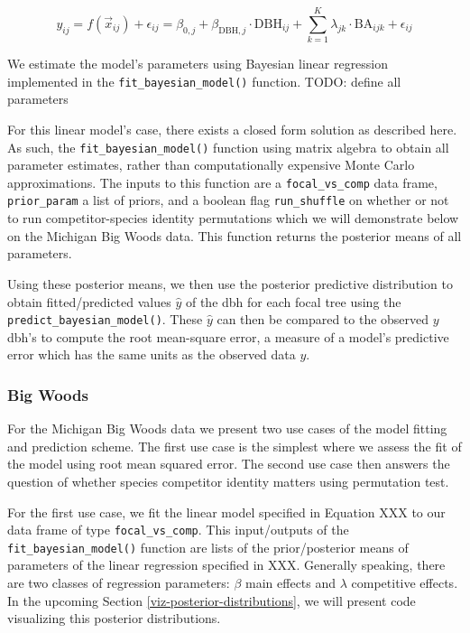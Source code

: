 \documentclass[12pt]{article}
\begin{document}
\[
\newcommand{\dbh}{\text{DBH}}
\newcommand{\biomass}{\text{biomass}}
\newcommand{\BA}{\text{BA}}
y_{ij} = f(\vec{x}_{ij}) + \epsilon_{ij} = \beta_{0,j} + \beta_{\dbh,j} \cdot \dbh_{ij} + \sum_{k=1}^{K} \lambda_{jk} \cdot \BA_{ijk} + \epsilon_{ij}
\]

We estimate the model's parameters using Bayesian linear regression
implemented in the \texttt{fit\_bayesian\_model()} function. TODO:
define all parameters

For this linear model's case, there exists a closed form solution as
described here. As such, the \texttt{fit\_bayesian\_model()} function
using matrix algebra to obtain all parameter estimates, rather than
computationally expensive Monte Carlo approximations. The inputs to this
function are a \texttt{focal\_vs\_comp} data frame,
\texttt{prior\_param} a list of priors, and a boolean flag
\texttt{run\_shuffle} on whether or not to run competitor-species
identity permutations which we will demonstrate below on the Michigan
Big Woods data. This function returns the posterior means of all
parameters.

Using these posterior means, we then use the posterior predictive
distribution to obtain fitted/predicted values \(\widehat{y}\) of the
dbh for each focal tree using the \texttt{predict\_bayesian\_model()}.
These \(\widehat{y}\) can then be compared to the observed \(y\) dbh's
to compute the root mean-square error, a measure of a model's predictive
error which has the same units as the observed data \(y\).

\hypertarget{big-woods-4}{%
\subsubsection{Big Woods}\label{big-woods-4}}

For the Michigan Big Woods data we present two use cases of the model
fitting and prediction scheme. The first use case is the simplest where
we assess the fit of the model using root mean squared error. The second
use case then answers the question of whether species competitor
identity matters using permutation test.

For the first use case, we fit the linear model specified in Equation
XXX to our data frame of type \texttt{focal\_vs\_comp}. This
input/outputs of the \texttt{fit\_bayesian\_model()} function are lists
of the prior/posterior means of parameters of the linear regression
specified in XXX. Generally speaking, there are two classes of
regression parameters: \(\beta\) main effects and \(\lambda\)
competitive effects. In the upcoming Section
\ref{viz-posterior-distributions}, we will present code visualizing this
posterior distributions.
\end{document}
